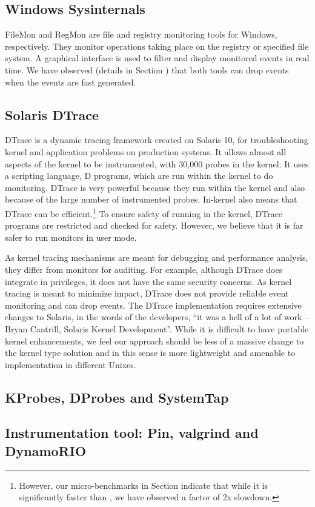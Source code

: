 \subsection{Windows Sysinternals}
\label{sec:sysinternals}

FileMon \cite{filemon} and RegMon \cite{regmon}
are file and registry monitoring tools for Windows, respectively.
They monitor operations taking place on
the registry or specified file system.
A graphical interface is used to filter and display monitored events in real time.
We have observed (details in Section ) that both tools can drop events when the
events are fast generated.

\subsection{Solaris DTrace}
\label{sec:dtrace}

DTrace\cite{cantrill2004dynamic} is a dynamic tracing framework
created on Solaris 10, for troubleshooting kernel and application problems
on production systems.
It allows almost all aspects of the kernel to
be instrumented, with 30,000 probes in the kernel.
It uses a scripting language, D programs,
which are run within the kernel to do monitoring.
DTrace is very powerful because
they run within the kernel and also because of the large number of
instrumented probes.
In-kernel also means that DTrace can be efficient.\footnote{
However, our micro-benchmarks in Section  indicate that while it is significantly
faster than , we have observed a factor of 2x slowdown.
}
To ensure safety of running in the kernel, DTrace programs
are restricted and checked for safety.
However, we believe that it is far safer to run monitors in user mode.

As kernel tracing mechanisms are meant for debugging and performance analysis,
they differ from monitors for auditing.
For example, although DTrace does integrate in privileges,
it does not have the same security concerns.
As kernel tracing is meant to minimize impact, DTrace does not provide
reliable event monitoring and can drop events.
The DTrace implementation requires extensive changes to Solaris, 
in the words of the developers, 
``it was a hell of a lot of work -- Bryan Cantrill, Solaris
Kernel Development''.
While it is difficult to have portable kernel enhancements, we feel our
approach should be less of a massive change to the kernel type solution and in
this sense is more lightweight and amenable to implementation 
in different Unixes.

\subsection{KProbes, DProbes and SystemTap}
\label{sec:systemtap}

\subsection{Instrumentation tool: Pin, valgrind and DynamoRIO}
\label{sec:instrumentation}
